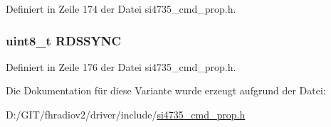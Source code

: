 Definiert in Zeile 174 der Datei si4735\+\_\+cmd\+\_\+prop.\+h.

\hypertarget{unionfm__rds__status__resp2_acdf4253982980384be3340fd9a9ab7c5}{}
\subsubsection[{R\+D\+S\+S\+Y\+N\+C}]{\setlength{\rightskip}{0pt plus 5cm}uint8\+\_\+t R\+D\+S\+S\+Y\+N\+C}\label{unionfm__rds__status__resp2_acdf4253982980384be3340fd9a9ab7c5}


Definiert in Zeile 176 der Datei si4735\+\_\+cmd\+\_\+prop.\+h.



Die Dokumentation für diese Variante wurde erzeugt aufgrund der Datei\+:\begin{DoxyCompactItemize}
\item 
D\+:/\+G\+I\+T/fhradiov2/driver/include/\hyperlink{si4735__cmd__prop_8h}{si4735\+\_\+cmd\+\_\+prop.\+h}\end{DoxyCompactItemize}
